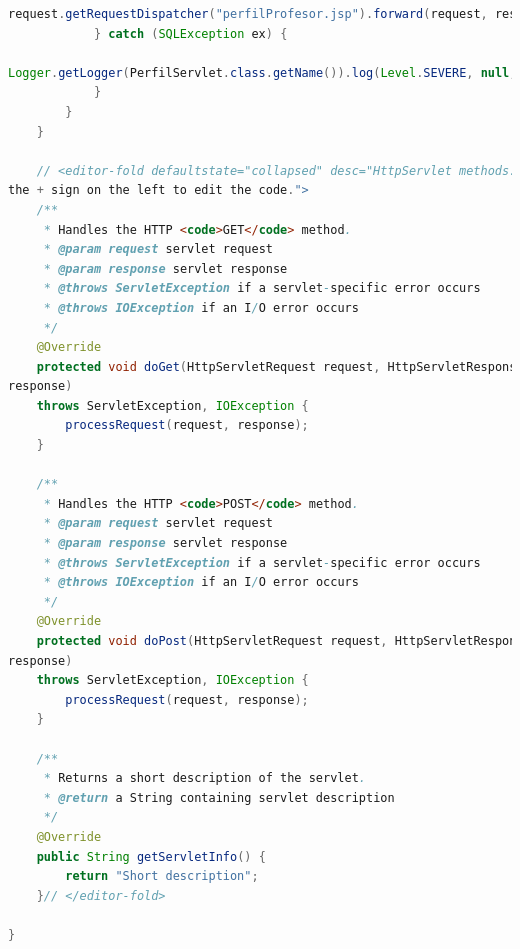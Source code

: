 \documentclass[a4paper,12pt]{article}
\begin{document}
\begin{lstlisting}[language=Java, style=customJava, 
caption={PerfilServlet.java}, captionpos=b,basicstyle=\fontfamily{cmss}\small]
request.getRequestDispatcher("perfilProfesor.jsp").forward(request, response);
            } catch (SQLException ex) {
                
Logger.getLogger(PerfilServlet.class.getName()).log(Level.SEVERE, null, ex);
            }
        }
    } 

    // <editor-fold defaultstate="collapsed" desc="HttpServlet methods. Click on 
the + sign on the left to edit the code.">
    /** 
     * Handles the HTTP <code>GET</code> method.
     * @param request servlet request
     * @param response servlet response
     * @throws ServletException if a servlet-specific error occurs
     * @throws IOException if an I/O error occurs
     */
    @Override
    protected void doGet(HttpServletRequest request, HttpServletResponse 
response)
    throws ServletException, IOException {
        processRequest(request, response);
    } 

    /** 
     * Handles the HTTP <code>POST</code> method.
     * @param request servlet request
     * @param response servlet response
     * @throws ServletException if a servlet-specific error occurs
     * @throws IOException if an I/O error occurs
     */
    @Override
    protected void doPost(HttpServletRequest request, HttpServletResponse 
response)
    throws ServletException, IOException {
        processRequest(request, response);
    }

    /** 
     * Returns a short description of the servlet.
     * @return a String containing servlet description
     */
    @Override
    public String getServletInfo() {
        return "Short description";
    }// </editor-fold>

}
\end{lstlisting}
\end{document}
